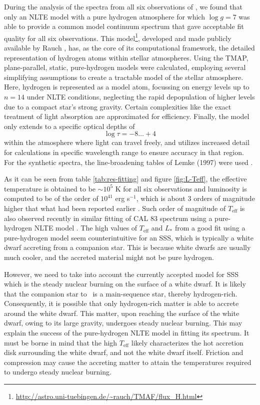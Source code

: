 		    During the analysis of the spectra from all six observations of \source, we found that only an NLTE model with a pure hydrogen atmosphere for which $\log{g}=7$ was able to provide a common model continuum spectrum that gave acceptable fit quality for all six observations. This model\footnote{\url{http://astro.uni-tuebingen.de/~rauch/TMAF/flux_H.html}}, developed and made publicly available by Rauch \etal, has, as the core of its computational framework, the detailed representation of hydrogen atoms within stellar atmospheres. Using the TMAP,  plane-parallel, static, pure-hydrogen models were calculated, employing several simplifying assumptions to create a tractable model of the stellar atmosphere. Here, hydrogen is represented as a model atom, focussing on energy levels up to $n=14$ under NLTE conditions, neglecting the rapid depopulation of higher levels due to a compact star's strong gravity. Certain complexities like the exact treatment of light absorption are approximated for efficiency. Finally, the model only extends to a specific optical depths of
		    $$\log{\tau}=-8\dots+4$$
		    within the atmosphere where light can travel freely, and utilizes increased detail for calculations in specific wavelength range to ensure accuracy in that region. For the synthetic spectra, the line-broadening tables of Lemke (1997) were used \cite{lemke1997extended}.
		    
		    As it can be seen from table \ref{tab:res-fitting} and figure \ref{fig:L-Teff}, the effective temperature is obtained to be $\sim 10^5$ K for all six observations and luminosity is computed to be of the order of $10^{41}$ erg s$^{-1}$, which is about 3 orders of magnitude higher that what had been reported earlier \cite{hartmann1999constraining}. Such order of magnitude of $T_\text{eff}$ is also observed recently in similar fitting of CAL 83 spectrum using a pure-hydrogen NLTE model \cite{stecchini2023revisiting}. The high values of $T_\text{eff}$ and $L_*$ from a good fit using a pure-hydrogen model seem counterintuitive for an SSS, which is typically a white dwarf accreting from a companion star. This is because white dwarfs are usually much cooler, and the accreted material might not be pure hydrogen.
    
    		However, we need to take into account the currently accepted model for SSS which is the steady nuclear burning on the surface of a white dwarf. It is likely that the companion star to \source\ is a main-sequence star, thereby hydrogen-rich. Consequently, it is possible that only hydrogen-rich matter is able to accrete around the white dwarf. This matter, upon reaching the surface of the white dwarf, owing to its large gravity, undergoes steady nuclear burning. This may explain the success of the pure-hydrogen NLTE model in fitting its spectrum. It must be borne in mind that the high $T_\text{eff}$ likely characterizes the hot accretion disk surrounding the white dwarf, and not the white dwarf itself. Friction and compression may cause the accreting matter to attain the temperatures required to undergo steady nuclear burning.
    		
